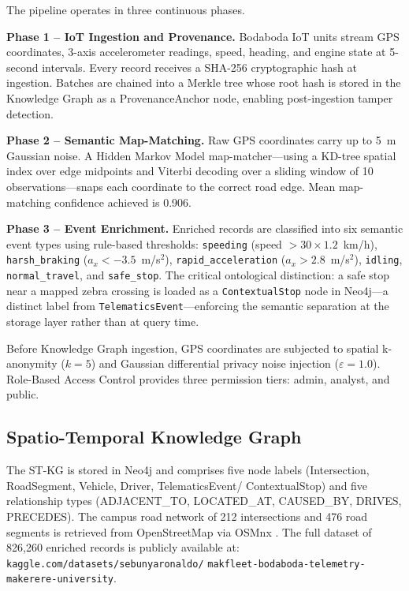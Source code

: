 \documentclass[conference]{IEEEtran}
\begin{document}
The pipeline operates in three continuous phases.

\textbf{Phase 1 -- IoT Ingestion and Provenance.} Bodaboda IoT
units stream GPS coordinates, 3-axis accelerometer readings, speed,
heading, and engine state at 5-second intervals. Every record
receives a SHA-256 cryptographic hash at ingestion. Batches are
chained into a Merkle tree whose root hash is stored in the
Knowledge Graph as a ProvenanceAnchor node, enabling post-ingestion
tamper detection.

\textbf{Phase 2 -- Semantic Map-Matching.} Raw GPS coordinates
carry up to 5~m Gaussian noise. A Hidden Markov Model
map-matcher---using a KD-tree spatial index over edge midpoints and
Viterbi decoding over a sliding window of 10 observations---snaps
each coordinate to the correct road edge. Mean map-matching
confidence achieved is 0.906.

\textbf{Phase 3 -- Event Enrichment.} Enriched records are
classified into six semantic event types using rule-based
thresholds: \texttt{speeding} (speed $> 30 \times 1.2$~km/h),
\texttt{harsh\_braking} ($a_x < -3.5$~m/s$^2$),
\texttt{rapid\_acceleration} ($a_x > 2.8$~m/s$^2$),
\texttt{idling}, \texttt{normal\_travel}, and
\texttt{safe\_stop}. The critical ontological distinction: a safe
stop near a mapped zebra crossing is loaded as a
\texttt{ContextualStop} node in Neo4j---a distinct label from
\texttt{TelematicsEvent}---enforcing the semantic separation at the
storage layer rather than at query time.

Before Knowledge Graph ingestion, GPS coordinates are subjected to
spatial k-anonymity ($k=5$) and Gaussian differential privacy noise
injection ($\varepsilon=1.0$). Role-Based Access Control provides
three permission tiers: admin, analyst, and public.

\subsection{Spatio-Temporal Knowledge Graph}

The ST-KG is stored in Neo4j and comprises five node labels
(Intersection, RoadSegment, Vehicle, Driver, TelematicsEvent/
ContextualStop) and five relationship types (ADJACENT\_TO,
LOCATED\_AT, CAUSED\_BY, DRIVES, PRECEDES). The campus road
network of 212 intersections and 476 road segments is retrieved
from OpenStreetMap via OSMnx \cite{boeing2017}. The full dataset
of 826,260 enriched records is publicly available at:
\texttt{kaggle.com/datasets/sebunyaronaldo/}\newline
\texttt{makfleet-bodaboda-telemetry-makerere-university}.
\end{document}
